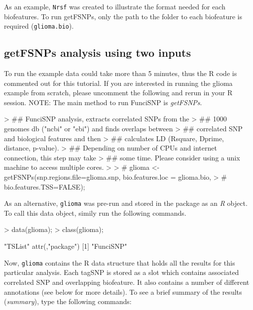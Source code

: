 \documentclass[12pt,fullpage]{article}
\newcommand{\Robject}[1]{{\texttt{#1}}}
\newcommand{\Rmethod}[1]{{\textit{#1}}}
\begin{document}
As an example, \Robject{Nrsf} was created to illustrate the format needed for
each biofeatures. To run getFSNPs, only the path to the folder to each
biofeature is required (\Robject{glioma.bio}).

\subsection{getFSNPs analysis using two inputs}

To run the example data could take more than 5 minutes, thus the R code is
commented out for this tutorial. If you are interested in running the glioma
example from scratch, please uncomment the following and rerun in your R
session. NOTE: The main method to run FunciSNP is \Rmethod{getFSNPs}.

\begin{Schunk}
\begin{Sinput}
> ## FunciSNP analysis, extracts correlated SNPs from the 
> ## 1000 genomes db ("ncbi" or "ebi") and finds overlaps between 
> ## correlated SNP and biological features and then 
> ## calculates LD (Rsquare, Dprime, distance, p-value).
> ## Depending on number of CPUs and internet connection, this step may take 
> ## some time. Please consider using a unix machine to access multiple cores.
> 
> # glioma <- getFSNPs(snp.regions.file=glioma.snp, bio.features.loc = glioma.bio,
> # bio.features.TSS=FALSE);
\end{Sinput}
\end{Schunk}

As an alternative, \Robject{glioma} was pre-run and stored in the package as an
\textit{R} object. To call this data object, simily run the following commands. 

\begin{Schunk}
\begin{Sinput}
> data(glioma);
> class(glioma);
\end{Sinput}
\begin{Soutput}
[1] "TSList"
attr(,"package")
[1] "FunciSNP"
\end{Soutput}
\end{Schunk}

Now, \Robject{glioma} contains the R data structure that holds all the results
for this particular analysis. Each tagSNP is stored as a slot which contains
associated correlated SNP and overlapping biofeature. It also contains a number
of different annotations (see below for more details). To see a brief summary of
the results (\Rmethod{summary}), type the following commands:
\end{document}
